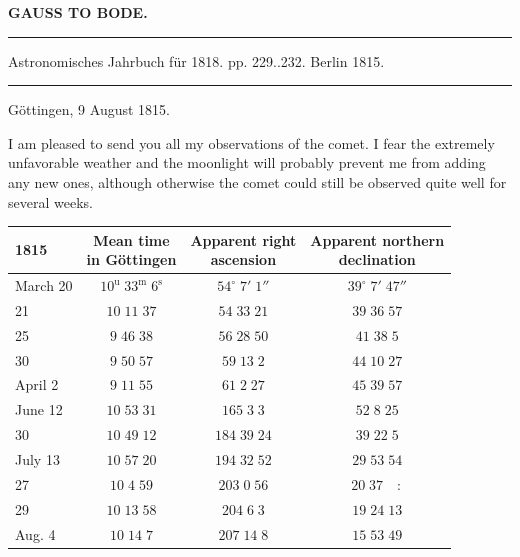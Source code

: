 \clearpage{}\hypertarget{native-392-lower}{}\label{native-392-lower}
\begin{center}\textbf{GAUSS TO BODE.}\par\vspace{4pt}\hrule\vspace{4pt}\fontsize{10}{12}\selectfont Astronomisches Jahrbuch für 1818. pp. 229..232. Berlin 1815.\par\vspace{4pt}\hrule\vspace{4pt}\end{center}

\begin{flushright}
Göttingen, 9 August 1815.
\end{flushright}

\par\indent I am pleased to send you all my observations of the comet. I fear the extremely unfavorable weather and the moonlight will probably prevent me from adding any new ones, although otherwise the comet could still be observed quite well for several weeks.

\begin{center}\fontsize{10}{12}\selectfont\setlength{\tabcolsep}{5pt}\renewcommand{\arraystretch}{1.15}\begin{tabular}{l|c|c|c}
1815 & \shortstack{Mean time\\in Göttingen} & \shortstack{Apparent right\\ascension} & \shortstack{Apparent northern\\declination}\\\hline
March 20 & $10^{\mathrm u}\;33^{\mathrm m}\;6^{\mathrm s}$ & $54^\circ\;7'\;1''$ & $39^\circ\;7'\;47''$\\
21 & $10\;11\;37$ & $54\;33\;21$ & $39\;36\;57$\\
25 & $9\;46\;38$ & $56\;28\;50$ & $41\;38\;5$\\
30 & $9\;50\;57$ & $59\;13\;2$ & $44\;10\;27$\\
April 2 & $9\;11\;55$ & $61\;2\;27$ & $45\;39\;57$\\
June 12 & $10\;53\;31$ & $165\;3\;3$ & $52\;8\;25$\\
30 & $10\;49\;12$ & $184\;39\;24$ & $39\;22\;5$\\
July 13 & $10\;57\;20$ & $194\;32\;52$ & $29\;53\;54$\\
27 & $10\;4\;59$ & $203\;0\;56$ & $20\;37\quad:$\\
29 & $10\;13\;58$ & $204\;6\;3$ & $19\;24\;13$\\
Aug. 4 & $10\;14\;7$ & $207\;14\;8$ & $15\;53\;49$\\
\end{tabular}\end{center}

